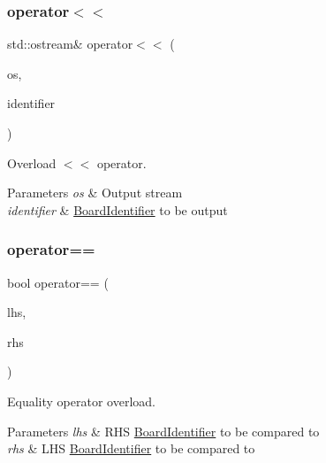 \subsubsection{\texorpdfstring{operator$<$$<$}{operator<<}}
{\footnotesize\ttfamily std\+::ostream\& operator$<$$<$ (\begin{DoxyParamCaption}\item[{std\+::ostream \&}]{os,  }\item[{const \hyperlink{class_board_identifier}{Board\+Identifier} \&}]{identifier }\end{DoxyParamCaption})\hspace{0.3cm}{\ttfamily [friend]}}



Overload $<$$<$ operator. 


\begin{DoxyParams}{Parameters}
{\em os} & Output stream \\
\hline
{\em identifier} & \hyperlink{class_board_identifier}{Board\+Identifier} to be output \\
\hline
\end{DoxyParams}
\mbox{\label{class_board_identifier_a7e5f6b9a11fbed47acc7aeafab856eed}} 
\subsubsection{\texorpdfstring{operator==}{operator==}}
{\footnotesize\ttfamily bool operator== (\begin{DoxyParamCaption}\item[{const \hyperlink{class_board_identifier}{Board\+Identifier} \&}]{lhs,  }\item[{const \hyperlink{class_board_identifier}{Board\+Identifier} \&}]{rhs }\end{DoxyParamCaption})\hspace{0.3cm}{\ttfamily [friend]}}



Equality operator overload. 


\begin{DoxyParams}{Parameters}
{\em lhs} & R\+HS \hyperlink{class_board_identifier}{Board\+Identifier} to be compared to \\
\hline
{\em rhs} & L\+HS \hyperlink{class_board_identifier}{Board\+Identifier} to be compared to \\
\hline
\end{DoxyParams}
\mbox{\label{class_board_identifier_a8be3f9aae87b9813d881a3c97c943d0d}} 
